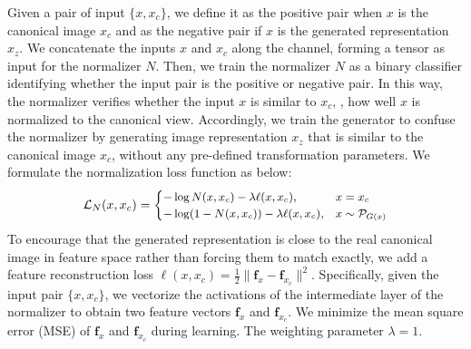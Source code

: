 \documentclass[runningheads]{llncs}
\begin{document}
Given a pair of input $\{x,x_c\}$, we define it as the positive pair when $x$ is the canonical image $x_c$ and as the negative pair if $x$ is the generated representation $x_z$. We concatenate the inputs $x$ and $x_c$ along the channel, forming a tensor as input for the normalizer $N$. Then, we train the normalizer $N$ as a binary classifier identifying whether the input pair is the positive or negative pair. In this way, the normalizer verifies whether the input $x$ is similar to $x_c$, \ie, how well $x$ is normalized to the canonical view. 
Accordingly, we train the generator to confuse the normalizer by generating image representation $x_z$ that is similar to the canonical image $x_c$, without any pre-defined transformation parameters. 
We formulate the normalization loss function as below:
\begin{equation}
	\begin{aligned}
    {\small 
    \mathcal{L}_N(x,x_{c}) = 
    \begin{cases}
    -\log N(x,x_{c}) - \lambda \ell(x, x_c), & x=x_c \\
    -\log(1-N(x,x_{c})) - \lambda \ell(x, x_c), & x \sim \mathcal{P}_{G(x)}
    \end{cases}
    }
    \label{eq:n}
    \end{aligned}
\end{equation}%
To encourage that the generated representation is close to the real canonical image in feature space rather than forcing them to match exactly, we add a feature reconstruction loss $\ell(x, x_c) = \frac{1}{2}\|\mathbf{f}_x - \mathbf{f}_{x_{c}}\|^2$. 
Specifically, given the input pair $\{x, x_c\}$, we vectorize the activations of the intermediate layer of the normalizer to obtain two feature vectors $\mathbf{f}_x$ and $\mathbf{f}_{x_c}$. We minimize the mean square error (MSE) of $\mathbf{f}_x$ and $\mathbf{f}_{x_c}$ during learning. The weighting parameter $\lambda=1$.
\end{document}
